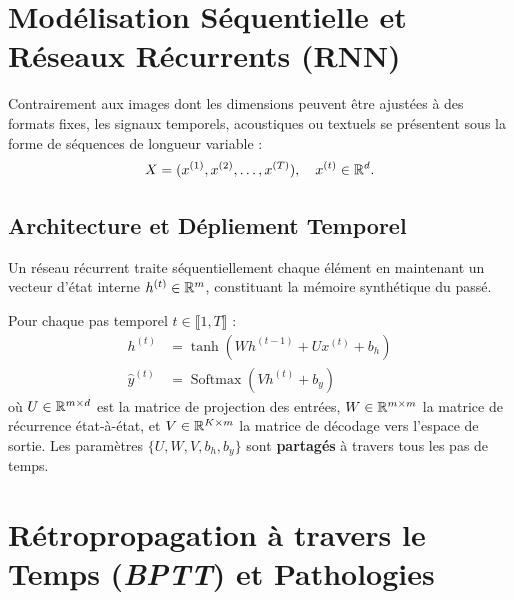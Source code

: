 \minitoc


\section{Modélisation Séquentielle et Réseaux Récurrents (RNN)}

Contrairement aux images dont les dimensions peuvent être ajustées à des formats fixes, les signaux temporels, acoustiques ou textuels se présentent sous la forme de séquences de longueur variable :
\begin{equation}
    X = (x^{(1)}, x^{(2)}, \dots, x^{(T)}), \quad x^{(t)} \in \mathbb{R}^d.
\end{equation}

\subsection{Architecture et Dépliement Temporel}

Un réseau récurrent traite séquentiellement chaque élément en maintenant un vecteur d'état interne $h^{(t)} \in \mathbb{R}^m$, constituant la mémoire synthétique du passé.

\begin{definition}
    Pour chaque pas temporel $t \in \llbracket 1, T \rrbracket$ :
    \begin{align}
        h^{(t)} &= \tanh\left( W h^{(t-1)} + U x^{(t)} + b_h \right) \\
        \hat{y}^{(t)} &= \operatorname{Softmax}\left( V h^{(t)} + b_y \right)
    \end{align}
    où $U \in \mathbb{R}^{m \times d}$ est la matrice de projection des entrées, $W \in \mathbb{R}^{m \times m}$ la matrice de récurrence état-à-état, et $V \in \mathbb{R}^{K \times m}$ la matrice de décodage vers l'espace de sortie. Les paramètres $\{U, W, V, b_h, b_y\}$ sont \textbf{partagés} à travers tous les pas de temps.
\end{definition}


\section{Rétropropagation à travers le Temps (\emph{BPTT}) et Pathologies}

